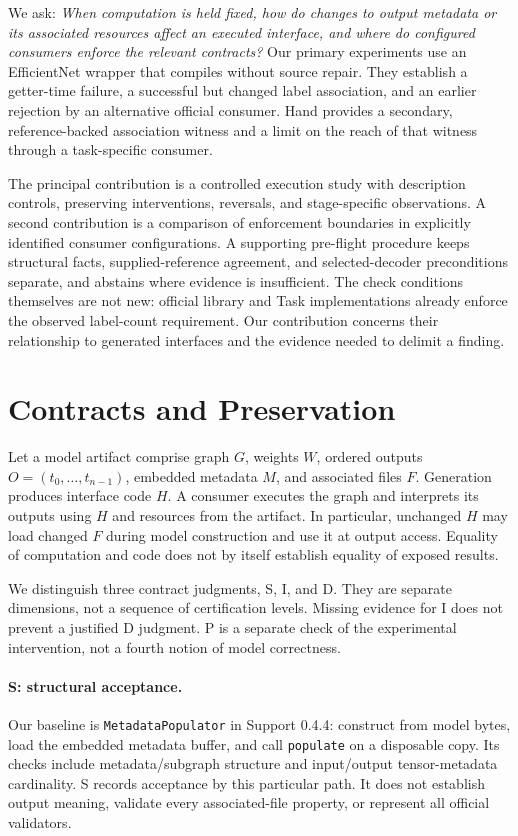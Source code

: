 \documentclass[10pt,twocolumn,letterpaper]{article}
\newcommand{\code}[1]{\texttt{#1}}
\begin{document}
We ask: \emph{When computation is held fixed, how do changes to output metadata or its associated resources affect an executed interface, and where do configured consumers enforce the relevant contracts?} Our primary experiments use an EfficientNet wrapper that compiles without source repair. They establish a getter-time failure, a successful but changed label association, and an earlier rejection by an alternative official consumer. Hand provides a secondary, reference-backed association witness and a limit on the reach of that witness through a task-specific consumer.

The principal contribution is a controlled execution study with description controls, preserving interventions, reversals, and stage-specific observations. A second contribution is a comparison of enforcement boundaries in explicitly identified consumer configurations. A supporting pre-flight procedure keeps structural facts, supplied-reference agreement, and selected-decoder preconditions separate, and abstains where evidence is insufficient. The check conditions themselves are not new: official library and Task implementations already enforce the observed label-count requirement. Our contribution concerns their relationship to generated interfaces and the evidence needed to delimit a finding.

\section{Contracts and Preservation}
\label{sec:contracts}
Let a model artifact comprise graph $G$, weights $W$, ordered outputs $O=(t_0,\ldots,t_{n-1})$, embedded metadata $M$, and associated files $F$. Generation produces interface code $H$. A consumer executes the graph and interprets its outputs using $H$ and resources from the artifact. In particular, unchanged $H$ may load changed $F$ during model construction and use it at output access. Equality of computation and code does not by itself establish equality of exposed results.

We distinguish three contract judgments, S, I, and D. They are separate dimensions, not a sequence of certification levels. Missing evidence for I does not prevent a justified D judgment. P is a separate check of the experimental intervention, not a fourth notion of model correctness.

\paragraph{S: structural acceptance.}
Our baseline is \code{MetadataPopulator} in Support 0.4.4: construct from model bytes, load the embedded metadata buffer, and call \code{populate} on a disposable copy. Its checks include metadata/subgraph structure and input/output tensor-metadata cardinality. S records acceptance by this particular path. It does not establish output meaning, validate every associated-file property, or represent all official validators.
\end{document}
